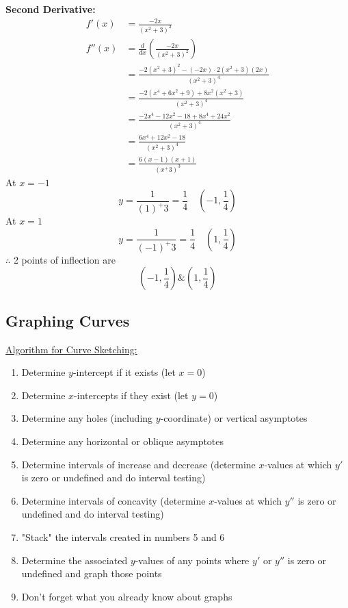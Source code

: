 \documentclass{article}
\begin{document}
\textbf{Second Derivative:}
\begin{align*}
f'(x) &= \frac{-2x}{(x^2+3)^2} \\
f''(x) &= \frac{d}{dx} \left(\frac{-2x}{(x^2+3)^2}\right) \\
      &= \frac{-2(x^2+3)^2 - (-2x) \cdot 2(x^2+3)(2x)}{(x^2+3)^4} \\
      &= \frac{-2(x^4 + 6x^2 + 9) + 8x^2(x^2+3)}{(x^2+3)^4} \\
      &= \frac{-2x^4 - 12x^2 - 18 + 8x^4 + 24x^2}{(x^2+3)^4} \\
      &= \frac{6x^4 + 12x^2 - 18}{(x^2+3)^4}\\
      &=\frac{6(x-1)(x+1)}{(x^+3)^3}
\end{align*}
At $x=-1$
$$y=\frac{1}{(1)^+3}=\frac{1}{4} \quad \left(-1, \frac{1}{4}\right)$$
At $x=1$
$$y=\frac{1}{(-1)^+3}=\frac{1}{4} \quad \left(1, \frac{1}{4}\right)$$
$\therefore$ 2 points of inflection are $$\left(-1, \frac{1}{4}\right) \& \left(1, \frac{1}{4}\right)$$

\subsection{Graphing Curves}
\underline{Algorithm for Curve Sketching:}
\begin{enumerate}
    \item Determine $y$-intercept if it exists (let $x=0$)
    \item Determine $x$-intercepts if they exist (let $y=0$)
    \item Determine any holes (including $y$-coordinate) or vertical asymptotes
    \item Determine any horizontal or oblique asymptotes
    \item Determine intervals of increase and decrease (determine $x$-values at which $y'$ is zero or undefined and do interval testing)
    \item Determine intervals of concavity (determine $x$-values at which $y''$ is zero or undefined and do interval testing)
    \item "Stack" the intervals created in numbers 5 and 6
    \item Determine the associated $y$-values of any points where $y'$ or $y''$ is zero or undefined and graph those points
    \item Don't forget what you already know about graphs \smiley{} 
\end{enumerate}
\end{document}

